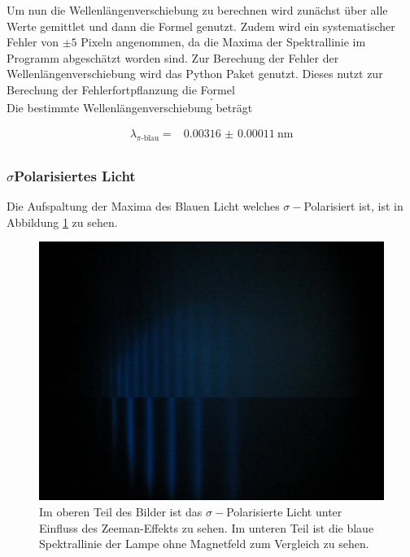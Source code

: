 Um nun die Wellenlängenverschiebung zu berechnen wird zunächst über alle Werte gemittlet und dann die Formel
%
genutzt.
Zudem wird ein systematischer Fehler von $\pm 5$ Pixeln angenommen, da die Maxima der Spektrallinie im Programm \cite{paint3d} abgeschätzt worden sind.
Zur Berechung der Fehler der Wellenlängenverschiebung wird das Python Paket \cite{uncertainties} genutzt.
Dieses nutzt zur Berechung der Fehlerfortpflanzung die Formel
\begin{equation}
    .
    \label{eq:fehler_Wellenlängenverschiebung}
\end{equation}
Die bestimmte Wellenlängenverschiebung beträgt

\begin{align*}
    \lambda _\text{$\pi$-blau} = & \SI{0.00316(011)}{\nano\meter} \\
\end{align*}

\subsubsection{\texorpdfstring{$\sigma$}-Polarisiertes Licht}

Die Aufspaltung der Maxima des Blauen Licht welches $\sigma -$Polarisiert ist, ist in Abbildung \ref{fig:sigma-blau} zu sehen.

\begin{figure}
    \centering
    \includegraphics[width=\textwidth]{content/data/Blue_sigma_0_uebernander.JPG}
    \caption{Im oberen Teil des Bilder ist das $\sigma -$Polarisierte Licht unter Einfluss des Zeeman-Effekts zu sehen. Im unteren Teil ist die blaue Spektrallinie der Lampe ohne Magnetfeld zum Vergleich zu sehen.}
    \label{fig:sigma-blau}
\end{figure}


